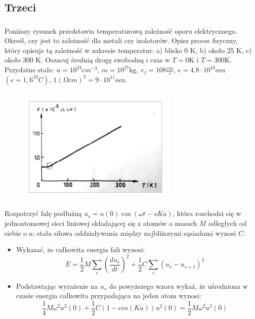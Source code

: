 \subsection{Trzeci}
\subsubsection{}
Poniższy rysunek przedstawia temperaturową zależność oporu elektrycznego. Określ, czy jest to zależność dla metali czy izolatorów. Opisz proces fizyczny, który opisuje tą zależność w zakresie temperatur: 
a) blisko 0 K, 
b) około 25 K, 
c) około 300 K. 
Oszacuj średnią drogę swobodną i czas w $T = 0$K i $T = 300$K. Przydatne stałe: $n = 10^{23} cm^{-3}$, $m = 10^{27}$kg, $v_f = 108 \frac{cm}{s}$, $e = 4.8 \cdot 10^{10} $esu $(e = 1,6^{19} C)$, $1(\Omega cm)^2 = 9 \cdot 10^{11}$esu.


\subsubsection{}
\begin{figure}[h]
\centering
\includegraphics[scale=0.7]{images/zes3-2}
\end{figure}


\subsubsection{}
Rozpatrzyć falę podłużną $u_s=u(0)\cos{(\omega t -sKa)}$, która rozchodzi się w jednoatomowej sieci liniowej składającej się  z atomów o masach $M$ odległych od siebie o $a$; stała siłowa oddziaływania między najbliższymi sąsiadami wynosi $C$.
\begin{itemize}
\item Wykazać, że całkowita energia fali wynosi:
\[E = \frac{1}{2}M \sum_s \left(\frac{du_s}{dt}\right)^2 + \frac{1}{2}C\sum_s(u_s - u_{s+1})^2\]
\item Podstawiając wyrażenie na $u_s$ do powyższego wzoru wykaż, że uśredniona w czasie energia całkowita przypadająca na jeden atom wynosi:
\[\frac{1}{4}M\omega^2 u^2(0) + \frac{1}{2}C(1-cos(Ka))u^2(0) = \frac{1}{2} M \omega^2 u^2(0)\]
\end{itemize}


